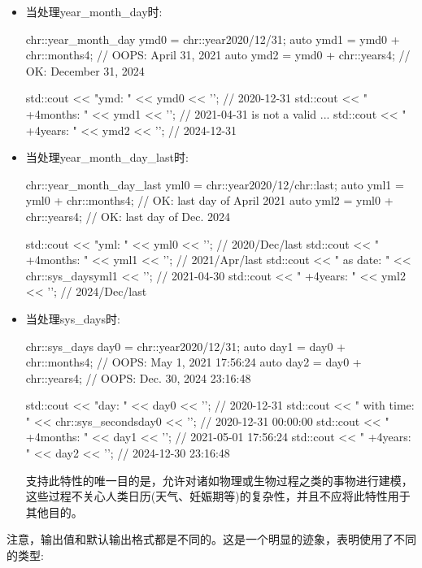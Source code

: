 \begin{itemize}
\item 
当处理year\_month\_day时:

\begin{cpp}
chr::year_month_day ymd0 = chr::year{2020}/12/31;
auto ymd1 = ymd0 + chr::months{4}; // OOPS: April 31, 2021
auto ymd2 = ymd0 + chr::years{4}; // OK: December 31, 2024

std::cout << "ymd: " << ymd0 << '\n'; // 2020-12-31
std::cout << " +4months: " << ymd1 << '\n'; // 2021-04-31 is not a valid ...
std::cout << " +4years: " << ymd2 << '\n'; // 2024-12-31
\end{cpp}

\item 
当处理year\_month\_day\_last时:

\begin{cpp}
chr::year_month_day_last yml0 = chr::year{2020}/12/chr::last;
auto yml1 = yml0 + chr::months{4}; // OK: last day of April 2021
auto yml2 = yml0 + chr::years{4}; // OK: last day of Dec. 2024

std::cout << "yml: " << yml0 << '\n'; // 2020/Dec/last
std::cout << " +4months: " << yml1 << '\n'; // 2021/Apr/last
std::cout << " as date: "
		  << chr::sys_days{yml1} << '\n'; // 2021-04-30
std::cout << " +4years: " << yml2 << '\n'; // 2024/Dec/last
\end{cpp}

\item 
当处理sys\_days时:

\begin{cpp}
chr::sys_days day0 = chr::year{2020}/12/31;
auto day1 = day0 + chr::months{4}; // OOPS: May 1, 2021 17:56:24
auto day2 = day0 + chr::years{4}; // OOPS: Dec. 30, 2024 23:16:48

std::cout << "day: " << day0 << '\n'; // 2020-12-31
std::cout << " with time: "
		  << chr::sys_seconds{day0} << '\n'; // 2020-12-31 00:00:00
std::cout << " +4months: " << day1 << '\n'; // 2021-05-01 17:56:24
std::cout << " +4years: " << day2 << '\n'; // 2024-12-30 23:16:48
\end{cpp}

支持此特性的唯一目的是，允许对诸如物理或生物过程之类的事物进行建模，这些过程不关心人类日历(天气、妊娠期等)的复杂性，并且不应将此特性用于其他目的。
\end{itemize}

注意，输出值和默认输出格式都是不同的。这是一个明显的迹象，表明使用了不同的类型:

